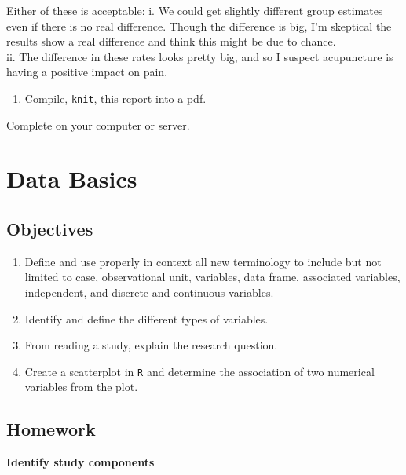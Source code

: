 \documentclass[
]{book}
\providecommand{\tightlist}{%
  \setlength{\itemsep}{0pt}\setlength{\parskip}{0pt}}
\begin{document}
Either of these is acceptable:
i. We could get slightly different group estimates even if there is no real difference. Though the difference is big, I'm skeptical the results show a real difference and think this might be due to chance.\\
ii. The difference in these rates looks pretty big, and so I suspect acupuncture is having a positive impact on pain.

\begin{enumerate}
\def\labelenumi{\arabic{enumi}.}
\setcounter{enumi}{2}
\tightlist
\item
  Compile, \texttt{knit}, this report into a pdf.
\end{enumerate}

Complete on your computer or server.

\hypertarget{DB}{%
\chapter{Data Basics}\label{DB}}

\hypertarget{objectives-1}{%
\section{Objectives}\label{objectives-1}}

\begin{enumerate}
\def\labelenumi{\arabic{enumi})}
\tightlist
\item
  Define and use properly in context all new terminology to include but not limited to case, observational unit, variables, data frame, associated variables, independent, and discrete and continuous variables.\\
\item
  Identify and define the different types of variables.\\
\item
  From reading a study, explain the research question.\\
\item
  Create a scatterplot in \texttt{R} and determine the association of two numerical variables from the plot.
\end{enumerate}

\hypertarget{homework-1}{%
\section{Homework}\label{homework-1}}

\textbf{Identify study components}
\end{document}

